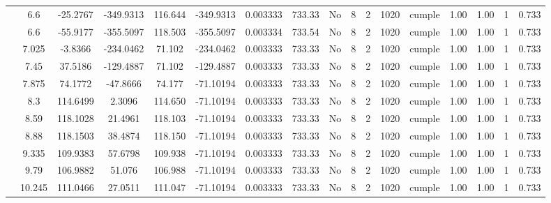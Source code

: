 \begin{table}[H]
{\begin{tabular}{|c|c|c|c|c|c|c|c|c|c|c|c|c|c|c|c|c|}
\cline{2-17}        & \cellcolor[rgb]{ .851,  .882,  .949}6.6 & -25.2767 & -349.9313 & 116.644 & -349.9313 & 0.003333 & 733.33 & No  & 8   & 2   & 1020 & \cellcolor[rgb]{ .776,  .937,  .808}cumple & 1.00 & 1.00 & 1   & 0.733 \bigstrut\\
\cline{2-17}        & \cellcolor[rgb]{ .851,  .882,  .949}6.6 & -55.9177 & -355.5097 & 118.503 & -355.5097 & 0.003334 & 733.54 & No  & 8   & 2   & 1020 & \cellcolor[rgb]{ .776,  .937,  .808}cumple & 1.00 & 1.00 & 1   & 0.733 \bigstrut\\
\cline{2-17}        & 7.025 & -3.8366 & -234.0462 & 71.102 & -234.0462 & 0.003333 & 733.33 & No  & 8   & 2   & 1020 & \cellcolor[rgb]{ .776,  .937,  .808}cumple & 1.00 & 1.00 & 1   & 0.733 \bigstrut\\
\cline{2-17}        & 7.45 & 37.5186 & -129.4887 & 71.102 & -129.4887 & 0.003333 & 733.33 & No  & 8   & 2   & 1020 & \cellcolor[rgb]{ .776,  .937,  .808}cumple & 1.00 & 1.00 & 1   & 0.733 \bigstrut\\
\cline{2-17}        & 7.875 & 74.1772 & -47.8666 & 74.177 & -71.10194 & 0.003333 & 733.33 & No  & 8   & 2   & 1020 & \cellcolor[rgb]{ .776,  .937,  .808}cumple & 1.00 & 1.00 & 1   & 0.733 \bigstrut\\
\cline{2-17}        & 8.3 & 114.6499 & 2.3096 & 114.650 & -71.10194 & 0.003333 & 733.33 & No  & 8   & 2   & 1020 & \cellcolor[rgb]{ .776,  .937,  .808}cumple & 1.00 & 1.00 & 1   & 0.733 \bigstrut\\
\cline{2-17}        & 8.59 & 118.1028 & 21.4961 & 118.103 & -71.10194 & 0.003333 & 733.33 & No  & 8   & 2   & 1020 & \cellcolor[rgb]{ .776,  .937,  .808}cumple & 1.00 & 1.00 & 1   & 0.733 \bigstrut\\
\cline{2-17}        & 8.88 & 118.1503 & 38.4874 & 118.150 & -71.10194 & 0.003333 & 733.33 & No  & 8   & 2   & 1020 & \cellcolor[rgb]{ .776,  .937,  .808}cumple & 1.00 & 1.00 & 1   & 0.733 \bigstrut\\
\cline{2-17}        & 9.335 & 109.9383 & 57.6798 & 109.938 & -71.10194 & 0.003333 & 733.33 & No  & 8   & 2   & 1020 & \cellcolor[rgb]{ .776,  .937,  .808}cumple & 1.00 & 1.00 & 1   & 0.733 \bigstrut\\
\cline{2-17}        & 9.79 & 106.9882 & 51.076 & 106.988 & -71.10194 & 0.003333 & 733.33 & No  & 8   & 2   & 1020 & \cellcolor[rgb]{ .776,  .937,  .808}cumple & 1.00 & 1.00 & 1   & 0.733 \bigstrut\\
\cline{2-17}        & 10.245 & 111.0466 & 27.0511 & 111.047 & -71.10194 & 0.003333 & 733.33 & No  & 8   & 2   & 1020 & \cellcolor[rgb]{ .776,  .937,  .808}cumple & 1.00 & 1.00 & 1   & 0.733 \bigstrut\\

\end{tabular}}
\end{table}
